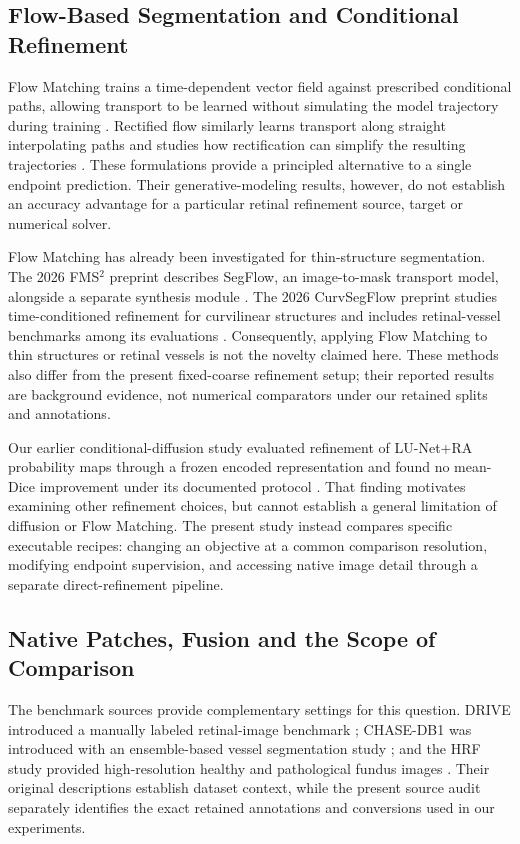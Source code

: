 \documentclass[jimaging,article,submit,pdftex,moreauthors]{Definitions/mdpi}
\begin{document}
\subsection{Flow-Based Segmentation and Conditional Refinement}
Flow Matching trains a time-dependent vector field against prescribed conditional
paths, allowing transport to be learned without simulating the model trajectory
during training \cite{Lipman2023}. Rectified flow similarly learns transport along
straight interpolating paths and studies how rectification can simplify the
resulting trajectories \cite{Liu2023RectifiedFlow}. These formulations provide a
principled alternative to a single endpoint prediction. Their generative-modeling
results, however, do not establish an accuracy advantage for a particular retinal
refinement source, target or numerical solver.

Flow Matching has already been investigated for thin-structure segmentation. The
2026 FMS$^2$ preprint describes SegFlow, an image-to-mask transport model, alongside
a separate synthesis module \cite{Asadi2026FMS2}. The 2026 CurvSegFlow preprint
studies time-conditioned refinement for curvilinear structures and includes
retinal-vessel benchmarks among its evaluations \cite{SidElMoctar2026CurvSegFlow}.
Consequently, applying Flow Matching to thin structures or retinal vessels is not
the novelty claimed here. These methods also differ from the present fixed-coarse
refinement setup; their reported results are background evidence, not numerical
comparators under our retained splits and annotations.

Our earlier conditional-diffusion study evaluated refinement of LU-Net+RA
probability maps through a frozen encoded representation and found no mean-Dice
improvement under its documented protocol \cite{Bayanian2026}. That finding
motivates examining other refinement choices, but cannot establish a general
limitation of diffusion or Flow Matching. The present study instead compares
specific executable recipes: changing an objective at a common comparison
resolution, modifying endpoint supervision, and accessing native image detail
through a separate direct-refinement pipeline.

\subsection{Native Patches, Fusion and the Scope of Comparison}
The benchmark sources provide complementary settings for this question. DRIVE
introduced a manually labeled retinal-image benchmark \cite{Staal2004}; CHASE-DB1
was introduced with an ensemble-based vessel segmentation study
\cite{Fraz2012}; and the HRF study provided high-resolution healthy and pathological
fundus images \cite{Odstrcilik2013}. Their original descriptions establish dataset
context, while the present source audit separately identifies the exact retained
annotations and conversions used in our experiments.
\end{document}
